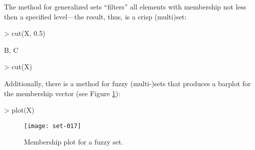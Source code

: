 \documentclass[fleqn]{article}
\newcommand{\dQuote}[1]{``{#1}''}
\newcommand{\codefun}[1]{\code{#1()}}
\begin{document}
The \codefun{cut} method for generalized sets
\dQuote{filters} all elements with membership
not less then a specified level---the result, thus, is a crisp (multi)set:
\begin{Schunk}
\begin{Sinput}
> cut(X, 0.5)
\end{Sinput}
\begin{Soutput}
{B, C}
\end{Soutput}
\begin{Sinput}
> cut(X)
\end{Sinput}
\begin{Soutput}
{}
\end{Soutput}
\end{Schunk}
Additionally, there is a \codefun{plot} method for fuzzy (multi-)sets
that produces a barplot for the membership vector (see Figure \ref{fig:plot}):
\begin{Schunk}
\begin{Sinput}
> plot(X)
\end{Sinput}
\end{Schunk}

\begin{figure}[h]
\begin{center}
\texttt{[image: set-017]}
\caption{Membership plot for a fuzzy set.}
\label{fig:plot}
\end{center}
\end{figure}


%   
%   

\end{document}
